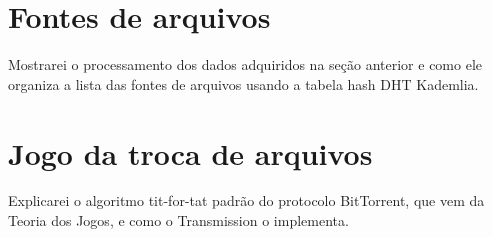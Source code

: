 \section{Fontes de arquivos}

Mostrarei o processamento dos dados adquiridos na seção anterior e como ele organiza a lista das fontes de arquivos usando a tabela hash DHT Kademlia.

\section{Jogo da troca de arquivos}

Explicarei o algoritmo tit-for-tat padrão do protocolo BitTorrent, que vem da Teoria dos Jogos, e como o Transmission o implementa.

\afterpage{\clearpage}